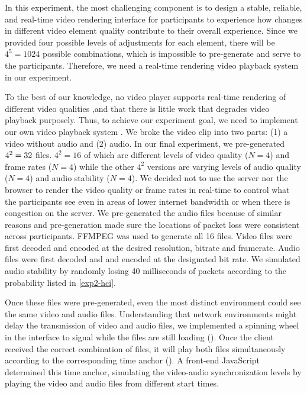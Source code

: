 In this experiment, the most challenging component is to design a stable, reliable, and real-time video rendering interface for participants to experience how changes in different video element quality contribute to their overall experience. Since we provided four possible levels of adjustments for each element, there will be $4^5 = 1024$ possible combinations, which is impossible to pre-generate and serve to the participants. Therefore, we need a real-time rendering video playback system in our experiment. 

To the best of our knowledge, no video player supports real-time rendering of different video qualities ,and that there is little work that degrades video playback purposely. Thus, to achieve our experiment goal, we need to implement our own video playback system . We broke the video clip into two parts: (1) a video without audio and (2) audio. In our final experiment, we pre-generated $4^2 \time 2 = 32$ files. $4^2 =16$ of which are different levels of video quality ($N=4$) and frame rates ($N=4$) while the other $4^2$ versions are  varying levels of audio quality ($N=4$) and audio stability ($N=4$). We decided not to use the server nor the browser to render the video quality or frame rates in real-time to control what the participants see even in areas of lower internet bandwidth or when there is congestion on the server. We pre-generated the audio files because of similar reasons and pre-generation made sure the locations of packet loss were consistent across participants. FFMPEG was used to generate all 16 files. Video files were first decoded and encoded at the desired resolution, bitrate and framerate. Audio files were first decoded and and encoded at the designated bit rate. We simulated audio stability by randomly losing 40 milliseconds of packets according to the probability listed in \ref{exp2-hci}.

Once these files were pre-generated, even the most distinct environment could see the same video and audio files. Understanding that network environments might delay the transmission of video and audio files, we implemented a spinning wheel in the interface to signal while the files are still loading (). Once the client received the correct combination of files, it will play both files simultaneously according to the corresponding time anchor (). A front-end JavaScript determined this time anchor, simulating the video-audio synchronization levels by playing the video and audio files from different start times. 

